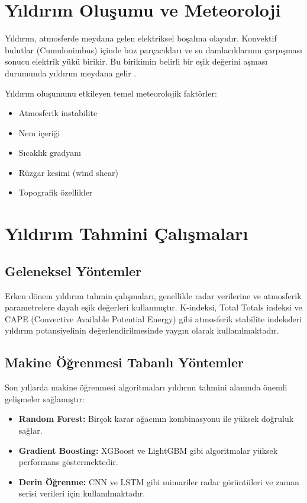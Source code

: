 \section{Yıldırım Oluşumu ve Meteoroloji}

Yıldırım, atmosferde meydana gelen elektriksel boşalma olayıdır. Konvektif bulutlar (Cumulonimbus) içinde buz parçacıkları ve su damlacıklarının çarpışması sonucu elektrik yükü birikir. Bu birikimin belirli bir eşik değerini aşması durumunda yıldırım meydana gelir \citep{rakov2003lightning}.

Yıldırım oluşumunu etkileyen temel meteorolojik faktörler:

\begin{itemize}
    \item Atmosferik instabilite
    \item Nem içeriği
    \item Sıcaklık gradyanı
    \item Rüzgar kesimi (wind shear)
    \item Topografik özellikler
\end{itemize}

\section{Yıldırım Tahmini Çalışmaları}

\subsection{Geleneksel Yöntemler}

Erken dönem yıldırım tahmin çalışmaları, genellikle radar verilerine ve atmosferik parametrelere dayalı eşik değerleri kullanmıştır. K-indeksi, Total Totals indeksi ve CAPE (Convective Available Potential Energy) gibi atmosferik stabilite indeksleri yıldırım potansiyelinin değerlendirilmesinde yaygın olarak kullanılmaktadır.

\subsection{Makine Öğrenmesi Tabanlı Yöntemler}

Son yıllarda makine öğrenmesi algoritmaları yıldırım tahmini alanında önemli gelişmeler sağlamıştır:

\begin{itemize}
    \item \textbf{Random Forest:} Birçok karar ağacının kombinasyonu ile yüksek doğruluk sağlar.
    \item \textbf{Gradient Boosting:} XGBoost ve LightGBM gibi algoritmalar yüksek performans göstermektedir.
    \item \textbf{Derin Öğrenme:} CNN ve LSTM gibi mimariler radar görüntüleri ve zaman serisi verileri için kullanılmaktadır.
\end{itemize}

